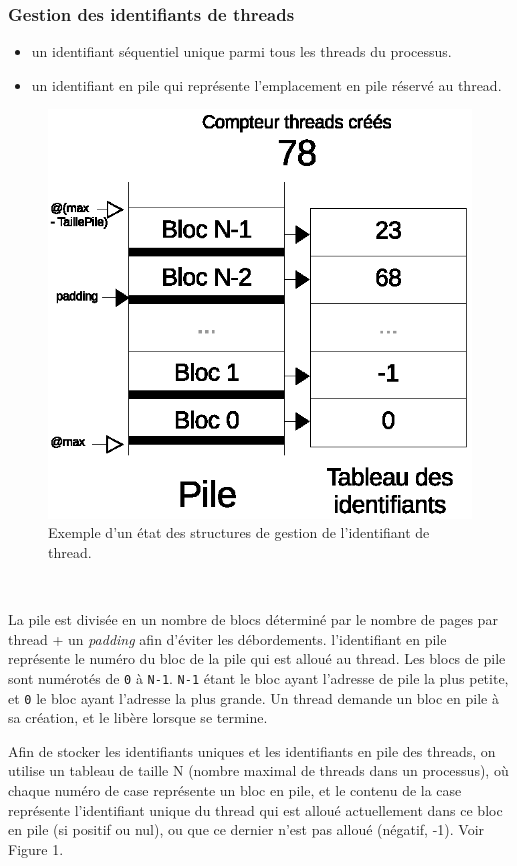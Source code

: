 \documentclass{article}
\begin{document}
		\subsubsection{Gestion des identifiants de threads}
			\begin{itemize}
				\item{un identifiant séquentiel unique parmi tous les threads du processus.}
				\item{un identifiant en pile qui représente l'emplacement en pile réservé au thread.}
			\end{itemize}
			\begin{figure}[h]
				  \centering
				  \includegraphics{schema_threads_id.eps}
				  \caption{Exemple d'un état des structures de gestion de l’identifiant de thread.}
			\end{figure}
			~\par{La pile est divisée en un nombre de blocs déterminé par le nombre de pages par thread + un \emph{padding} afin d'éviter les débordements. l'identifiant en pile représente le numéro du bloc de la pile qui est alloué au thread. Les blocs de pile sont numérotés de \texttt{0} à \texttt{N-1}. \texttt{N-1} étant le bloc ayant l'adresse de pile la plus petite, et \texttt{0} le bloc ayant l'adresse la plus grande. Un thread demande un bloc en pile à sa création, et le libère lorsque se termine.}
			~\par{Afin de stocker les identifiants uniques et les identifiants en pile des threads, on utilise un tableau de taille N (nombre maximal de threads dans un processus), où chaque numéro de case représente un bloc en pile, et le contenu de la case représente l'identifiant unique du thread qui est alloué actuellement dans ce bloc en pile (si positif ou nul), ou que ce dernier n'est pas alloué (négatif, -1). Voir Figure 1.}
\end{document}
